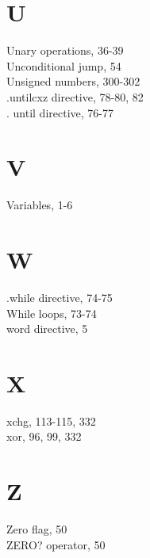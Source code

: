 \documentclass[10pt]{article}
\begin{document}
\section*{U}
Unary operations, 36-39\\
Unconditional jump, 54\\
Unsigned numbers, 300-302\\
.untilcxz directive, 78-80, 82\\
. until directive, 76-77

\section*{V}
Variables, 1-6

\section*{W}
.while directive, 74-75\\
While loops, 73-74\\
word directive, 5

\section*{X}
xchg, 113-115, 332\\
xor, 96, 99, 332

\section*{Z}
Zero flag, 50\\
ZERO? operator, 50
\end{document}
